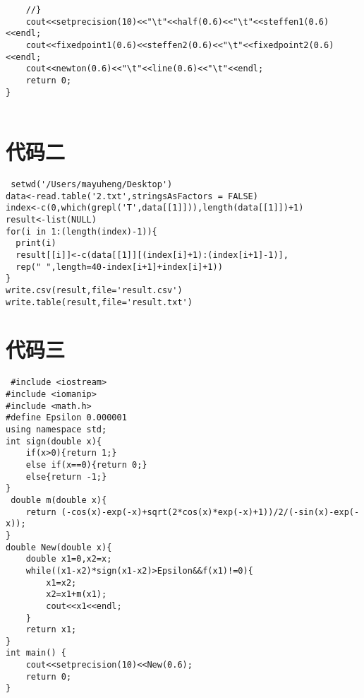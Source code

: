 \documentclass[a4paper,11pt,onecolumn,twoside]{article}
\begin{document}
\begin{appendices}
\begin{lstlisting}
    //}
    cout<<setprecision(10)<<"\t"<<half(0.6)<<"\t"<<steffen1(0.6)<<endl;
    cout<<fixedpoint1(0.6)<<steffen2(0.6)<<"\t"<<fixedpoint2(0.6)<<endl;
    cout<<newton(0.6)<<"\t"<<line(0.6)<<"\t"<<endl;
    return 0;
}


      \end{lstlisting}
 \section{代码二}
 \begin{lstlisting}
 setwd('/Users/mayuheng/Desktop')
data<-read.table('2.txt',stringsAsFactors = FALSE)
index<-c(0,which(grepl('T',data[[1]])),length(data[[1]])+1)
result<-list(NULL)
for(i in 1:(length(index)-1)){
  print(i)
  result[[i]]<-c(data[[1]][(index[i]+1):(index[i+1]-1)],
  rep(" ",length=40-index[i+1]+index[i]+1))
}
write.csv(result,file='result.csv')
write.table(result,file='result.txt')
 \end{lstlisting}
  \section{代码三}
 \begin{lstlisting}
 #include <iostream>
#include <iomanip>
#include <math.h>
#define Epsilon 0.000001
using namespace std;
int sign(double x){
    if(x>0){return 1;}
    else if(x==0){return 0;}
    else{return -1;}
}
 double m(double x){
    return (-cos(x)-exp(-x)+sqrt(2*cos(x)*exp(-x)+1))/2/(-sin(x)-exp(-x));
}
double New(double x){
    double x1=0,x2=x;
    while((x1-x2)*sign(x1-x2)>Epsilon&&f(x1)!=0){
        x1=x2;
        x2=x1+m(x1);
        cout<<x1<<endl;
    }
    return x1;
}
int main() {
    cout<<setprecision(10)<<New(0.6);
    return 0;
}
  \end{lstlisting}
\end{appendices}
\end{document}

